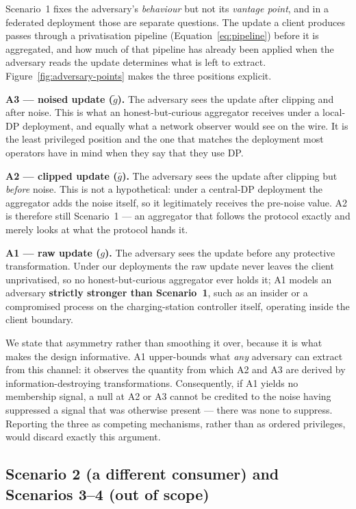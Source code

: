 Scenario~1 fixes the adversary's \emph{behaviour} but not its \emph{vantage
point}, and in a federated deployment those are separate questions. The
update a client produces passes through a privatisation pipeline
(Equation~\ref{eq:pipeline}) before it is aggregated, and how much of that
pipeline has already been applied when the adversary reads the update
determines what is left to extract. Figure~\ref{fig:adversary-points} makes
the three positions explicit.

\textbf{A3 --- noised update ($\tilde{g}$).} The adversary sees the update
after clipping and after noise. This is what an honest-but-curious
aggregator receives under a local-DP deployment, and equally what a network
observer would see on the wire. It is the least privileged position and the
one that matches the deployment most operators have in mind when they
say that they use DP.

\textbf{A2 --- clipped update ($\bar{g}$).} The adversary sees the update
after clipping but \emph{before} noise. This is not a hypothetical: under a
central-DP deployment the aggregator adds the noise itself, so it
legitimately receives the pre-noise value. A2 is therefore still Scenario~1
--- an aggregator that follows the protocol exactly and merely looks at what
the protocol hands it.

\textbf{A1 --- raw update ($g$).} The adversary sees the update before any
protective transformation. Under our deployments the raw update never leaves
the client unprivatised, so no honest-but-curious aggregator ever holds it;
A1 models an adversary \textbf{strictly stronger than Scenario~1}, such as
an insider or a compromised process on the charging-station controller
itself, operating inside the client boundary.

We state that asymmetry rather than smoothing it over, because it is what
makes the design informative. A1 upper-bounds what \emph{any} adversary can
extract from this channel: it observes the quantity from which A2 and A3 are
derived by information-destroying transformations. Consequently, if A1
yields no membership signal, a null at A2 or A3 cannot be credited to the
noise having suppressed a signal that was otherwise present --- there was
none to suppress. Reporting the three as competing mechanisms, rather than
as ordered privileges, would discard exactly this argument.

\subsection{Scenario 2 (a different consumer) and Scenarios 3--4 (out of scope)}
\label{sec:threat-s2}

